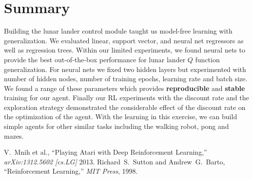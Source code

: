 \documentclass[conference]{IEEEtran}
\begin{document}
\section*{Summary}
Building the lunar lander control module taught us model-free learning with generalization. We evaluated linear, support vector, and neural net regressors as well as regression trees. Within our limited experiments, we found neural nets to provide the best out-of-the-box performance for lunar lander $Q$ function generalization. For neural nets we fixed two hidden layers but experimented with number of hidden nodes, number of training epochs, learning rate and batch size. We found a range of these parameters which provides {\bf reproducible} and {\bf stable} training for our agent. Finally our RL experiments with the discount rate and the exploration strategy demonstrated the considerable effect of the discount rate on the optimization of the agent.  With the learning in this exercise, we can build simple agents for other similar tasks including the walking robot, pong and mazes. 
\begin{thebibliography}{1}
V.~Mnih et al., ``Playing Atari with Deep Reinforcement Learning,'' {\em arXiv:1312.5602 [cs.LG]} 2013.
Richard~S.~Sutton and Andrew~G.~Barto, ``Reinforcement Learning,'' {\em MIT Press}, 1998.
\end{thebibliography}
\end{document}
